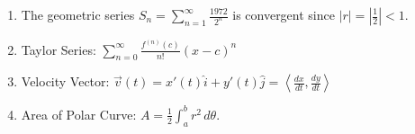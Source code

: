 \documentclass[12pt]{article}
\begin{document}
\begin{enumerate}
\begin{enumerate}
        \item The geometric series $S_n = \sum_{n=1}^{\infty} \frac{1972}{2^n}$ is convergent since $\left|r\right| = \left|\frac{1}{2}\right| < 1$.
        
        \item Taylor Series: $\sum_{n=0}^{\infty} \frac{f^{(n)}(c)}{n!}(x-c)^n$
        
        \item Velocity Vector: $\vec{v}(t) = x'(t)\hat{i} + y'(t)\hat{j} = \left\langle \frac{dx}{dt}, \frac{dy}{dt} \right\rangle$
        
        \item Area of Polar Curve: \( A = \frac{1}{2} \int_a^b r^2 \, d\theta \).
    \end{enumerate}
\end{enumerate}
\end{document}
